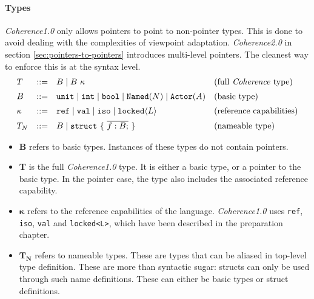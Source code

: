 \documentclass[a4paper,12pt,fleqn]{article}
\begin{document}
\paragraph{Types\\}
\textit{Coherence1.0} only allows pointers to point to non-pointer types. This is done to avoid dealing with the complexities of viewpoint adaptation. \textit{Coherence2.0} in section \ref{sec:pointers-to-pointers} introduces multi-level pointers. The cleanest way to enforce this is at the syntax level.
\[
\begin{array}{lcll}
T & ::= & B \mid B\ \kappa & \text{(full \textit{Coherence} type)} \\[0.5em]
B & ::= & \mathtt{unit} \mid \mathtt{int} \mid \mathtt{bool} \mid \mathtt{Named}(N) \mid \mathtt{Actor}(A) & \text{(basic type)} \\[0.5em]
\kappa & ::= & \mathtt{ref} \mid \mathtt{val} \mid \mathtt{iso} \mid \mathtt{locked}\langle L \rangle & \text{(reference capabilities)} \\[0.5em]
T_N & ::= & B  \mid \mathtt{struct}\ \{\ \overline{f : B;}\ \} & \text{(nameable type)}
\end{array}
\]
\begin{itemize}
    \item \textbf{B} refers to basic types. Instances of these types do not contain pointers.
    \item \textbf{T} is the full \textit{Coherence1.0} type. It is either a basic type, or a pointer to the basic type. In the pointer case, the type also includes the associated reference capability.
    \item $\boldsymbol{\kappa}$ refers to the reference capabilities of the language. \textit{Coherence1.0} uses \texttt{ref}, \texttt{iso}, \texttt{val} and \texttt{locked<L>}, which have been described in the preparation chapter.
    \item $\boldsymbol{T_N}$ refers to nameable types. These are types that can be aliased in top-level type definition. These are more than syntactic sugar: structs can only be used through such name definitions. These can either be basic types or struct definitions.
\end{itemize}
\end{document}
